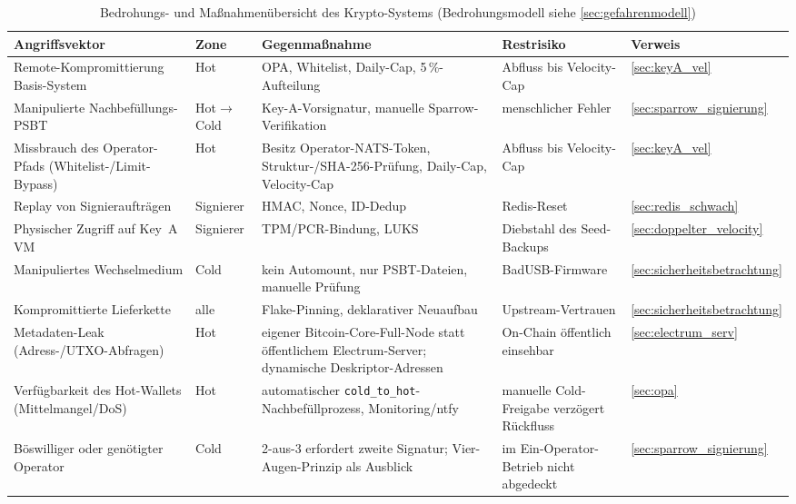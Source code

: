 \begin{table}[htbp]
\centering
\footnotesize
\begin{tabular}{@{}p{3.3cm} l p{4.0cm} p{3.4cm} l@{}}
\toprule
\textbf{Angriffsvektor} & \textbf{Zone} & \textbf{Gegenmaßnahme} & \textbf{Restrisiko} & \textbf{Verweis} \\
\midrule
Remote-Kompromittierung Basis-System & Hot & \ac{OPA}, Whitelist, Daily-Cap, 5\,\%-Aufteilung & Abfluss bis Velocity-Cap & \ref{sec:keyA_vel} \\
Manipulierte Nachbefüllungs-\ac{PSBT} & Hot$\to$Cold & Key-A-Vorsignatur, manuelle Sparrow-Verifikation & menschlicher Fehler & \ref{sec:sparrow_signierung} \\
Missbrauch des Operator-Pfads (Whitelist-/Limit-Bypass) & Hot & Besitz Operator-\ac{NATS}-Token, Struktur-/SHA-256-Prüfung, Daily-Cap, Velocity-Cap & Abfluss bis Velocity-Cap & \ref{sec:keyA_vel} \\
Replay von Signieraufträgen & Signierer & \ac{HMAC}, Nonce, \ac{ID}-Dedup & Redis-Reset & \ref{sec:redis_schwach} \\
Physischer Zugriff auf Key~A \ac{VM} & Signierer & \ac{TPM}/\ac{PCR}-Bindung, LUKS & Diebstahl des Seed-Backups & \ref{sec:doppelter_velocity} \\
Manipuliertes Wechselmedium & Cold & kein Automount, nur \ac{PSBT}-Dateien, manuelle Prüfung & BadUSB-Firmware & \ref{sec:sicherheitsbetrachtung} \\
Kompromittierte Lieferkette & alle & Flake-Pinning, deklarativer Neuaufbau & Upstream-Vertrauen & \ref{sec:sicherheitsbetrachtung} \\
Metadaten-Leak (Adress-/\ac{UTXO}-Abfragen) & Hot & eigener Bitcoin-Core-Full-Node statt öffentlichem Electrum-Server; dynamische Deskriptor-Adressen & On-Chain öffentlich einsehbar & \ref{sec:electrum_serv} \\
Verfügbarkeit des Hot-Wallets (Mittelmangel/\ac{DoS}) & Hot & automatischer \texttt{cold\_to\_hot}-Nachbefüllprozess, Monitoring/ntfy & manuelle Cold-Freigabe verzögert Rückfluss & \ref{sec:opa} \\
Böswilliger oder genötigter Operator & Cold & 2-aus-3 erfordert zweite Signatur; Vier-Augen-Prinzip als Ausblick & im Ein-Operator-Betrieb nicht abgedeckt & \ref{sec:sparrow_signierung} \\
\bottomrule
\end{tabular}
\caption{Bedrohungs- und Maßnahmenübersicht des Krypto-Systems (Bedrohungsmodell siehe \ref{sec:gefahrenmodell})}
\label{tab:threat_matrix}
\end{table}